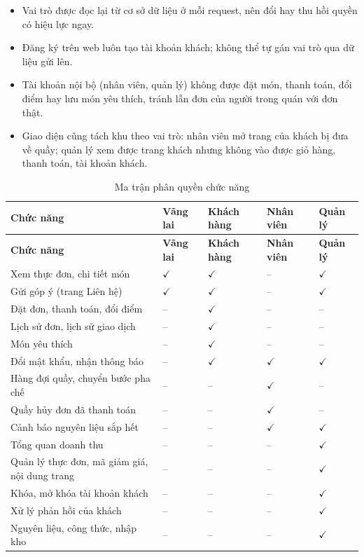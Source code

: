 \documentclass[12pt,a4paper]{article}
\newcommand{\co}{$\checkmark$}
\newcommand{\khong}{--}
\begin{document}
\begin{itemize}
  \item Vai trò được đọc lại từ cơ sở dữ liệu ở mỗi request, nên đổi hay thu hồi quyền có hiệu lực ngay.
  \item Đăng ký trên web luôn tạo tài khoản khách; không thể tự gán vai trò qua dữ liệu gửi lên.
  \item Tài khoản nội bộ (nhân viên, quản lý) không được đặt món, thanh toán, đổi điểm hay lưu món yêu thích, tránh lẫn đơn của người trong quán với đơn thật.
  \item Giao diện cũng tách khu theo vai trò: nhân viên mở trang của khách bị đưa về quầy; quản lý xem được trang khách nhưng không vào được giỏ hàng, thanh toán, tài khoản khách.
\end{itemize}

\begin{longtable}{|p{6.2cm}|>{\centering\arraybackslash}p{1.7cm}|>{\centering\arraybackslash}p{1.7cm}|>{\centering\arraybackslash}p{1.7cm}|>{\centering\arraybackslash}p{1.5cm}|}
\caption{Ma trận phân quyền chức năng}\\
\hline
\textbf{Chức năng} & \textbf{Vãng lai} & \textbf{Khách hàng} & \textbf{Nhân viên} & \textbf{Quản lý} \\ \hline
\endfirsthead
\hline
\textbf{Chức năng} & \textbf{Vãng lai} & \textbf{Khách hàng} & \textbf{Nhân viên} & \textbf{Quản lý} \\ \hline
\endhead
Xem thực đơn, chi tiết món            & \co & \co & \khong & \co \\ \hline
Gửi góp ý (trang Liên hệ)             & \co & \co & \khong & \co \\ \hline
Đặt đơn, thanh toán, đổi điểm         & \khong & \co & \khong & \khong \\ \hline
Lịch sử đơn, lịch sử giao dịch        & \khong & \co & \khong & \khong \\ \hline
Món yêu thích                         & \khong & \co & \khong & \khong \\ \hline
Đổi mật khẩu, nhận thông báo          & \khong & \co & \co & \co \\ \hline
Hàng đợi quầy, chuyển bước pha chế    & \khong & \khong & \co & \khong \\ \hline
Quầy hủy đơn đã thanh toán            & \khong & \khong & \co & \khong \\ \hline
Cảnh báo nguyên liệu sắp hết          & \khong & \khong & \co & \co \\ \hline
Tổng quan doanh thu                   & \khong & \khong & \khong & \co \\ \hline
Quản lý thực đơn, mã giảm giá, nội dung trang & \khong & \khong & \khong & \co \\ \hline
Khóa, mở khóa tài khoản khách         & \khong & \khong & \khong & \co \\ \hline
Xử lý phản hồi của khách              & \khong & \khong & \khong & \co \\ \hline
Nguyên liệu, công thức, nhập kho      & \khong & \khong & \khong & \co \\ \hline
\end{longtable}
\end{document}
